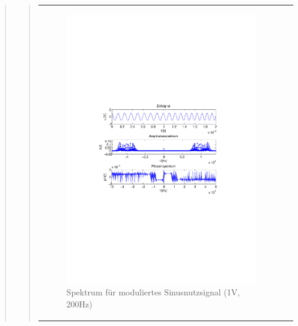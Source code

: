 \begin{quote}
\begin{quote}
\begin{center}
\begin{tabular}{ll}
\begin{minipage}{0.6\textwidth}
                \end{minipage}
                \begin{minipage}{0.6\textwidth}

                     \begin{figure}[H]
                        \label{fig:}
                        \includegraphics[scale=0.5, trim = 4cm 9.5cm 3.5cm
                        9.5cm, clip]{./Bilder/sin_a1_f200}
                        \caption{Spektrum für moduliertes Sinusnutzsignal (1V,
                        200Hz)}
                    \end{figure}
               \vspace{-1.5em}

                \end{minipage}


\end{tabular}
\end{center}
\end{quote}
\end{quote}
